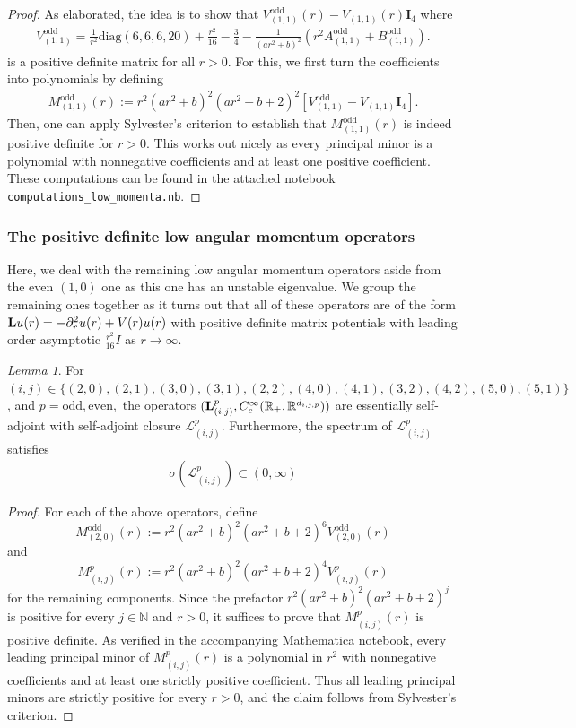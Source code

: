 \documentclass[11pt,reqno]{amsart}
\theoremstyle{remark}
\newtheorem{lem}{Lemma}[section]
\newcommand{\R}{\mathbb{R}}
\newcommand{\Lf}{\textup{\textbf{L}}}
\theoremstyle{definition}
\begin{document}
\begin{proof}
As elaborated, the idea is to show that $V_{(1,1)}^{\mathrm{odd}}(r) -V_{(1,1)}(r) \mathbf I_4$ where
\begin{align*}
 V_{(1,1)}^{\mathrm{odd}}= \frac1{r^2} \text{diag}(6,6,6,20)
+\frac{r^2}{16}-\frac 34
- \frac{1}{(ar^2 + b)^2} \left( r^2 A_{(1,1)}^{\mathrm{odd}}+ B_{(1,1)}^{\mathrm{odd}} \right).
\end{align*}
is a positive definite matrix for all $r>0$. 
For this, we first turn the coefficients into polynomials by defining
\begin{align*}
M_{(1,1)}^{\mathrm{odd}}(r):= r^2 (a r^2+b)^2(a r^2+b+2)^2[ V_{(1,1)}^{\mathrm{odd}}-V_{(1,1)} \mathbf I_4].
\end{align*}
Then, one can apply Sylvester's criterion to establish that $M_{(1,1)}^{\mathrm{odd}}(r)$ is indeed positive definite for $r>0$. This works out nicely as every principal minor is a polynomial with nonnegative coefficients and at least one positive coefficient.
These computations can be found in the attached notebook \texttt{computations\_low\_momenta.nb}. 
\end{proof}
\subsubsection*{The positive definite low angular momentum operators}
Here, we deal with the remaining low angular momentum operators aside from the even $(1,0)$ one as this one has an unstable eigenvalue. We group the remaining ones together as it turns out that all of these operators are of the form $\Lf u(r)=-\partial_r^2 u(r)+V(r) u(r)$ with positive definite matrix potentials with leading order asymptotic $\frac{r^2}{16}I$ as $r\to \infty$. 

\begin{lem}
For $(i,j)\in \{(2,0),(2,1),(3,0),(3,1),(2,2),(4,0),(4,1),(3,2),(4,2),(5,0),(5,1)\}$, and $p=\mathrm{odd},\mathrm{even},$ the operators $(\Lf_{(i,j)}^p,C^\infty_{c}(\R_+,\R^{d_{i,j,p}}))$ are essentially self-adjoint with self-adjoint closure $\mathcal{L}_{(i,j)}^p$.
Furthermore, the spectrum of $\mathcal{L}_{(i,j)}^p$ satisfies
\begin{align*}
\sigma(\mathcal{L}_{(i,j)}^p)\subset (0,\infty)
\end{align*}
\end{lem}
\begin{proof}
For each of the above operators, define
\[
    M^\mathrm{odd}_{(2,0)}(r) := r^2(ar^2+b)^2(ar^2+b+2)^6 V^\mathrm{odd}_{(2,0)}(r)
\]
and 
\[
    M^p_{(i,j)}(r) := r^2(ar^2+b)^2(ar^2+b+2)^4 V^p_{(i,j)}(r)
\]
for the remaining components. 
Since the prefactor $r^2(ar^2+b)^2(ar^2+b+2)^{j}$ is positive for every $j \in \mathbb N$ and $r>0$, it suffices to prove that
$M^p_{(i,j)}(r)$ is positive definite. As verified in the accompanying
Mathematica notebook, every leading principal minor of $M^p_{(i,j)}(r)$
is a polynomial in $r^2$ with nonnegative coefficients and at least one
strictly positive coefficient. Thus all leading principal minors are
strictly positive for every $r>0$, and the claim follows from
Sylvester's criterion.
\end{proof}
\end{document}
